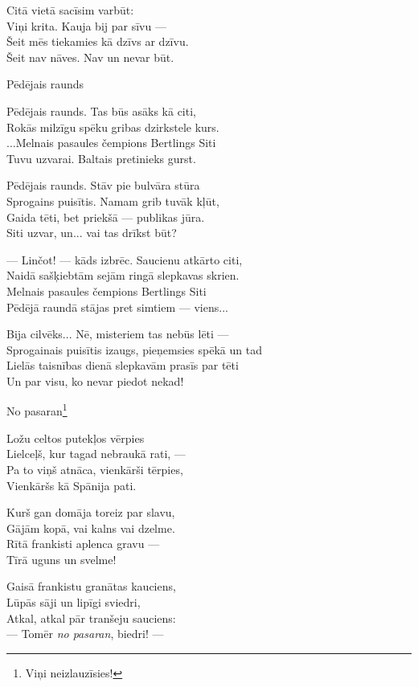 \documentclass[14pt]{extarticle}
\begin{document}
{Citā vietā sacīsim varbūt:\\
Viņi krita. Kauja bij par sīvu ---\\
Šeit mēs tiekamies kā dzīvs ar dzīvu.\\
Šeit nav nāves. Nav un nevar būt.

\newpage

{\large \sc Pēdējais raunds}

Pēdējais raunds. Tas būs asāks kā citi,\\
Rokās milzīgu spēku gribas dzirkstele kurs.\\
...Melnais pasaules čempions Bertlings Siti\\
Tuvu uzvarai. Baltais pretinieks gurst.

Pēdējais raunds. Stāv pie bulvāra stūra\\
Sprogains puisītis. Namam grib tuvāk kļūt,\\
Gaida tēti, bet priekšā --- publikas jūra.\\
Siti uzvar, un... vai tas drīkst būt?

--- Linčot! --- kāds izbrēc. Saucienu atkārto citi,\\
Naidā sašķiebtām sejām ringā slepkavas skrien.\\
Melnais pasaules čempions Bertlings Siti\\
Pēdējā raundā stājas pret simtiem --- viens...

Bija cilvēks... Nē, misteriem tas nebūs lēti ---\\
Sprogainais puisītis izaugs, pieņemsies spēkā un tad\\
Lielās taisnības dienā slepkavām prasīs par tēti\\
Un par visu, ko nevar piedot nekad!

\newpage

{\large \sc No pasaran\footnote{Viņi neizlauzīsies!}}

Ložu celtos putekļos vērpies\\
Lielceļš, kur tagad nebraukā rati, ---\\
Pa to viņš atnāca, vienkārši tērpies,\\
Vienkāršs kā Spānija pati.

Kurš gan domāja toreiz par slavu,\\
Gājām kopā, vai kalns vai dzelme.\\
Rītā frankisti aplenca gravu ---\\
Tīrā uguns un svelme!

Gaisā frankistu granātas kauciens,\\
Lūpās sāji un lipīgi sviedri,\\
Atkal, atkal pār tranšeju sauciens:\\
--- Tomēr {\em no pasaran}, biedri! ---

}
\end{document}
